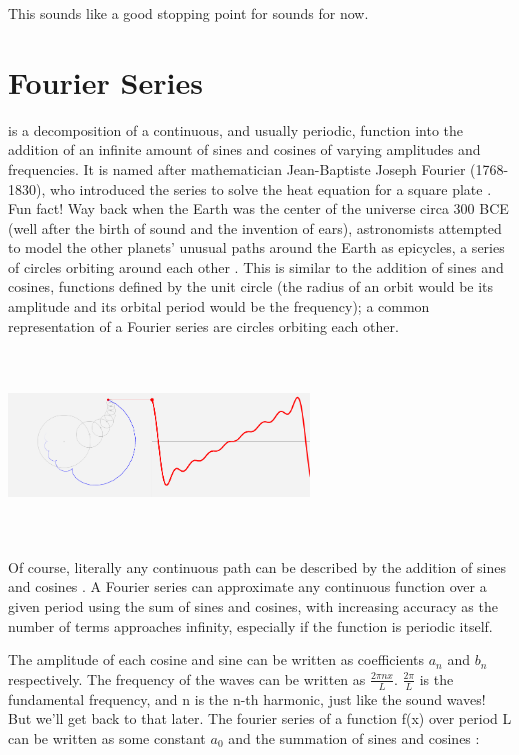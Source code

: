\documentclass{tufte-handout}
\begin{document}
	This sounds like a good stopping point for sounds for now.
\section{Fourier Series}
is a decomposition of a continuous, and usually periodic, function into the addition of an infinite amount of sines and cosines of varying amplitudes and frequencies. It is named after mathematician Jean-Baptiste Joseph Fourier (1768-1830), who introduced the series to solve the heat equation for a square plate \cite{FWho}. Fun fact! Way back when the Earth was the center of the universe circa 300 BCE (well after the birth of sound and the invention of ears), astronomists attempted to model the other planets' unusual paths around the Earth as epicycles, a series of circles orbiting around each other \cite{Earth}. This is similar to the addition of sines and cosines, functions defined by the unit circle (the radius of an orbit would be its amplitude and its orbital period would be the frequency); a common representation of a Fourier series are circles orbiting each other.

\includegraphics[width=8cm, height=5cm]{Circles.png}
	
Of course, literally any continuous path can be described by the addition of sines and cosines \cite{Homer}. A Fourier series can approximate any continuous function over a given period using the sum of sines and cosines, with increasing accuracy as the number of terms approaches infinity, especially if the function is periodic itself. 

The amplitude of each cosine and sine can be written as coefficients $a_n$ and $b_n$ respectively. The frequency of the waves can be written as $\frac{2\pi nx}{L}$. $\frac{2\pi}{L}$ is the fundamental frequency, and n is the n-th harmonic, just like the sound waves! But we'll get back to that later. The fourier series of a function f(x) over period L can be written as some constant $a_0$ and the summation of sines and cosines \cite{Wolfram, FWho}:
	
\end{document}
